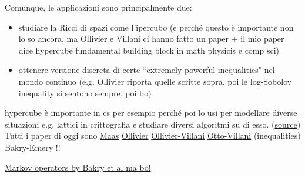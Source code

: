 Comunque, le applicazioni sono principalmente due:
\begin{itemize}
    \item studiare la Ricci di spazi come l'ipercubo (e perché questo è importante non lo so ancora, ma Ollivier e Villani ci hanno fatto un paper \cite{olliviervillani} + il mio paper dice hypercube fundamental building block in math physicis e comp sci)
    \item ottenere versione discreta di certe ``extremely powerful inequalities" nel mondo continuo (e.g. Ollivier \cite{ollivier2009ricci} riporta quelle scritte sopra. poi le log-Sobolov inequality si sentono sempre. poi bo)
\end{itemize}


hypercube è importante in cs per esempio perché poi lo usi per modellare diverse situazioni e.g. lattici in crittografia e studiare diversi algoritmi su di esso. (\href{https://www.sciencedirect.com/science/article/pii/S0378437117312487}{source})
\\

Tutti i paper di oggi sono
\href{https://janmaas.org/papers/discrete.pdf}{Maas}
\href{https://www.math.uchicago.edu/~shmuel/QuantCourse%20/Metric%20Space/Ollivier,%20Ricci%20curvature%20of%20Metric%20Spaces.pdf}{Ollivier}
\href{http://www.yann-ollivier.org/rech/publs/cube.pdf}{Ollivier-Villani}
\href{https://www.sciencedirect.com/science/article/pii/S0022123699935577}{Otto-Villani} (inequalities) 
Bakry-Emery !!

\href{https://math.univ-lyon1.fr/~gentil/BGL-introduction.pdf}{Markov operators by Bakry et al ma bo!}




